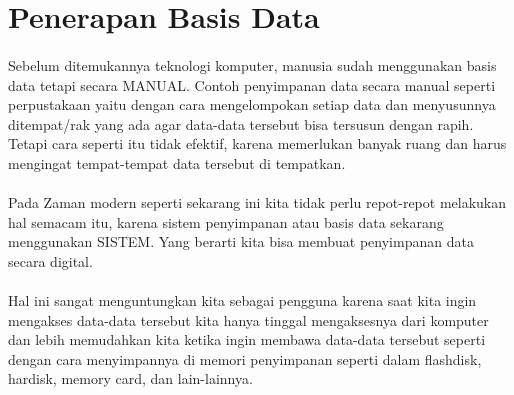 \documentclass{article}
\begin{document}
\section{ Penerapan Basis Data }
\paragraph{}
Sebelum ditemukannya teknologi komputer, manusia sudah menggunakan basis data tetapi secara MANUAL. Contoh penyimpanan data secara manual seperti perpustakaan yaitu dengan cara mengelompokan setiap data dan menyusunnya ditempat/rak yang ada agar data-data tersebut bisa tersusun dengan rapih. Tetapi cara seperti itu tidak efektif, karena memerlukan banyak ruang dan harus mengingat tempat-tempat data tersebut di tempatkan.
\paragraph{}
Pada Zaman modern seperti sekarang ini kita tidak perlu repot-repot melakukan hal semacam itu, karena sistem penyimpanan atau basis data sekarang menggunakan SISTEM. Yang berarti kita bisa membuat penyimpanan data secara digital.
\paragraph{}
Hal ini sangat menguntungkan kita sebagai pengguna karena saat kita ingin mengakses data-data tersebut kita hanya tinggal mengaksesnya dari komputer dan lebih memudahkan kita ketika ingin membawa data-data tersebut seperti dengan cara menyimpannya di memori penyimpanan seperti dalam flashdisk, hardisk, memory card, dan lain-lainnya.
\end{document}
